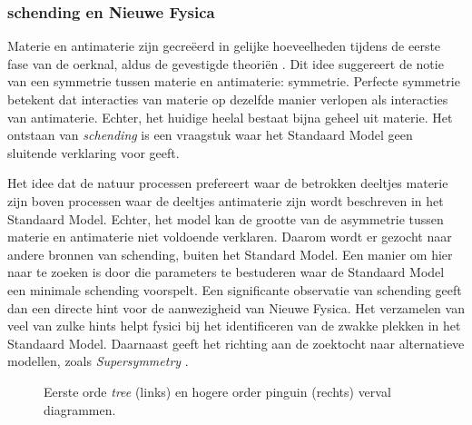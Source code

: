 \subsubsection{\CP schending en Nieuwe Fysica}
Materie en antimaterie zijn gecre\"eerd in gelijke hoeveelheden tijdens de eerste fase van de oerknal, aldus de gevestigde theori\"en \cite{more-cpv-huet,more-cpv-gavela_I,more-cpv-gavela_II}. Dit idee suggereert de notie van een symmetrie tussen materie en antimaterie: \CP symmetrie. Perfecte \CP symmetrie betekent dat interacties van materie op dezelfde manier verlopen als interacties van antimaterie. Echter, het huidige heelal bestaat bijna geheel uit materie. Het ontstaan van  {\it \CP schending} is een vraagstuk waar het Standaard Model geen sluitende verklaring voor geeft.


Het idee dat de natuur processen prefereert waar de betrokken deeltjes materie zijn boven processen waar de deeltjes antimaterie zijn wordt beschreven in het Standaard Model. Echter, het model kan de grootte van de asymmetrie tussen materie en antimaterie niet voldoende verklaren. Daarom wordt er gezocht naar andere bronnen van \CP schending, buiten het Standard Model. Een manier om hier naar te zoeken is door  die parameters te bestuderen waar de Standaard Model een minimale \CP schending voorspelt. Een significante observatie van \CP schending geeft dan een directe hint voor de aanwezigheid van Nieuwe Fysica. Het verzamelen van veel van zulke hints helpt fysici bij het identificeren van de zwakke plekken in het Standaard Model. Daarnaast geeft het richting aan de zoektocht naar alternatieve modellen, zoals {\it Supersymmetry}  \eg \cite{Golfand:1971iw,Volkov:1973ix,Wess:1974tw}.


\begin{figure}[t]
  \begin{subfigure}{0.5\textwidth}
    \raggedright
    {\scalebox{1}{\sffamily }}
    \caption{}
    \label{app_jpsiphi_tree}
  \end{subfigure}%
  \hfill
  \begin{subfigure}{0.5\textwidth}
    \raggedleft
    {\scalebox{1}{\sffamily }}
    \caption{}
    \label{app_jpsiphi_peng}
  \end{subfigure}
     \caption{Eerste orde {\it tree} (links) en hogere order pinguin (rechts) \BsJpsiPhi verval diagrammen.}
  \label{app_jpsiphi_tree_peng}
\end{figure}



